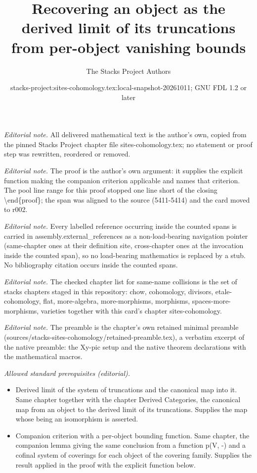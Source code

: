 \documentclass[10pt,a4paper]{amsart}
\title{Recovering an object as the derived limit of its truncations from per-object vanishing bounds}
\author{The Stacks Project Authors}
\date{stacks-project:sites-cohomology.tex:local-snapshot-20261011; GNU FDL 1.2 or later}
\theoremstyle{plain}
\theoremstyle{definition}
\theoremstyle{remark}
\numberwithin{equation}{subsection}
\begin{document}
\maketitle
\noindent\textit{Editorial note.} All delivered mathematical text is the author's own, copied from the pinned Stacks Project chapter file sites-cohomology.tex; no statement or proof step was rewritten, reordered or removed.\par\medskip
\noindent\textit{Editorial note.} The proof is the author's own argument: it supplies the explicit function making the companion criterion applicable and names that criterion. The pool line range for this proof stopped one line short of the closing \textbackslash{}end\{proof\}; the span was aligned to the source (5411-5414) and the card moved to r002.\par\medskip
\noindent\textit{Editorial note.} Every labelled reference occurring inside the counted spans is carried in assembly.external\_references as a non-load-bearing navigation pointer (same-chapter ones at their definition site, cross-chapter ones at the invocation inside the counted span), so no load-bearing mathematics is replaced by a stub. No bibliography citation occurs inside the counted spans.\par\medskip
\noindent\textit{Editorial note.} The checked chapter list for same-name collisions is the set of stacks chapters staged in this repository: chow, cohomology, divisors, etale-cohomology, flat, more-algebra, more-morphisms, morphisms, spaces-more-morphisms, varieties together with this card's chapter sites-cohomology.\par\medskip
\noindent\textit{Editorial note.} The preamble is the chapter's own retained minimal preamble (sources/stacks-sites-cohomology/retained-preamble.tex), a verbatim excerpt of the native preamble: the Xy-pic setup and the native theorem declarations with the mathematical macros.\par\medskip
\noindent\textit{Allowed standard prerequisites (editorial).}\begin{itemize}
\item Derived limit of the system of truncations and the canonical map into it. Same chapter together with the chapter Derived Categories, the canonical map from an object to the derived limit of its truncations. Supplies the map whose being an isomorphism is asserted.
\item Companion criterion with a per-object bounding function. Same chapter, the companion lemma giving the same conclusion from a function p(V, -) and a cofinal system of coverings for each object of the covering family. Supplies the result applied in the proof with the explicit function below.
\end{itemize}\medskip
\end{document}
